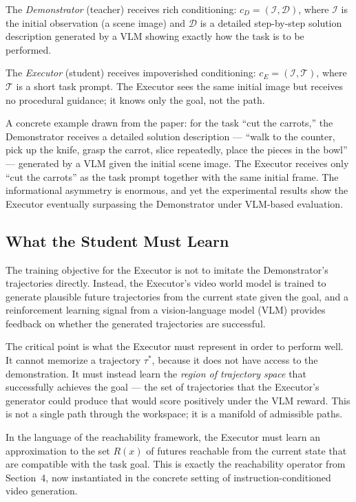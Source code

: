 \documentclass[12pt, a4paper]{article}
\theoremstyle{plain}
\theoremstyle{definition}
\theoremstyle{remark}
\newcommand{\reachset}[1]{R(#1)}
\begin{document}
The \emph{Demonstrator} (teacher) receives rich conditioning:
$c_D = (\mathcal{I}, \mathcal{D})$, where $\mathcal{I}$ is the initial
observation (a scene image) and $\mathcal{D}$ is a detailed step-by-step
solution description generated by a VLM showing exactly how the task is
to be performed.

The \emph{Executor} (student) receives impoverished conditioning:
$c_E = (\mathcal{I}, \mathcal{T})$, where $\mathcal{T}$ is a short
task prompt. The Executor sees the same initial image but receives no
procedural guidance; it knows only the goal, not the path.

A concrete example drawn from the paper: for the task ``cut the carrots,''
the Demonstrator receives a detailed solution description --- ``walk to the
counter, pick up the knife, grasp the carrot, slice repeatedly, place
the pieces in the bowl'' --- generated by a VLM given the initial scene
image. The Executor receives only ``cut the carrots'' as the task prompt
together with the same initial frame. The informational asymmetry is
enormous, and yet the experimental results show the Executor eventually
surpassing the Demonstrator under VLM-based evaluation.

\subsection{What the Student Must Learn}

The training objective for the Executor is not to imitate the Demonstrator's
trajectories directly. Instead, the Executor's video world model is trained
to generate plausible future trajectories from the current state given the
goal, and a reinforcement learning signal from a vision-language model (VLM)
provides feedback on whether the generated trajectories are successful.

The critical point is what the Executor must represent in order to perform
well. It cannot memorize a trajectory $\tau^*$, because it does not have
access to the demonstration. It must instead learn the \emph{region of
trajectory space} that successfully achieves the goal --- the set of
trajectories that the Executor's generator could produce that would score
positively under the VLM reward. This is not a single path through the
workspace; it is a manifold of admissible paths.

In the language of the reachability framework, the Executor must learn an
approximation to the set $\reachset{x}$ of futures reachable from the current
state that are compatible with the task goal. This is exactly the reachability
operator from Section~4, now instantiated in the concrete setting of
instruction-conditioned video generation.
\end{document}
